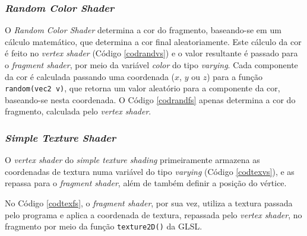 	

\subsubsection{\textit{Random Color Shader}}

	O \textit{Random Color Shader} determina a cor do fragmento, baseando-se em um cálculo matemático, que determina a cor final aleatoriamente. Este cálculo da cor é feito no \textit{vertex shader} (Código \ref{codrandvs}) e o valor resultante é passado para o \textit{fragment shader}, por meio da variável \textit{color} do tipo \textit{varying}. Cada componente da cor é calculada passando uma coordenada ($x$, $y$ ou $z$) para a função \texttt{random(vec2 v)}, que retorna um valor aleatório para a componente da cor, baseando-se nesta coordenada. O Código \ref{codrandfs} apenas determina a cor do fragmento, calculada pelo \textit{vertex shader}.

	
 
	

\subsubsection{\textit{Simple Texture Shader}}

	O \textit{vertex shader} do \textit{simple texture shading} primeiramente armazena as coordenadas de textura numa variável do tipo \textit{varying} (Código \ref{codtexvs}), e as repassa para o \textit{fragment shader}, além de também definir a posição do vértice.  

	

	No Código \ref{codtexfs}, o \textit{fragment shader}, por sua vez, utiliza a textura passada pelo programa e aplica a coordenada de textura, repassada pelo \textit{vertex shader}, no fragmento por meio da função \texttt{texture2D()} da GLSL.

	

